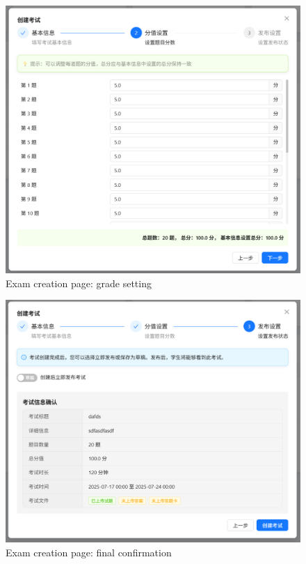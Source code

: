 \documentclass[12pt]{article}
\begin{document}
\begin{figure}[H]
    \centering
    \includegraphics[width=\textwidth]{admin/createexam2.png}
    \caption{Exam creation page: grade setting}
    \label{fig:ExamCreation page2}
\end{figure}
\begin{figure}[H]
    \centering
    \includegraphics[width=\textwidth]{admin/createexam3.png}
    \caption{Exam creation page: final confirmation}
    \label{fig:ExamCreation page3}
\end{figure}
\end{document}
